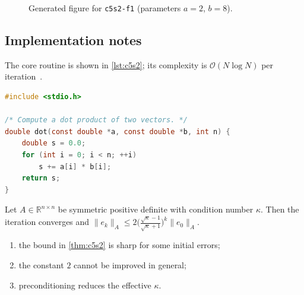 \begin{figure}[htbp]
\centering
{}
\caption{Generated figure for \texttt{c5s2-f1} (parameters $a=2$, $b=8$).}\label{fig:c5s2-f1}
\end{figure}

\lipsum[130-131]

\subsection{Implementation notes}\label{sec:c5s2-i}
The core routine is shown in \cref{lst:c5s2}; its complexity is $\mathcal{O}(N\log N)$ per iteration~\cite{ch5-6}.

\begin{lstlisting}[language=c,caption={Reference implementation for c5s2.},label={lst:c5s2}]
#include <stdio.h>

/* Compute a dot product of two vectors. */
double dot(const double *a, const double *b, int n) {
    double s = 0.0;
    for (int i = 0; i < n; ++i)
        s += a[i] * b[i];
    return s;
}
\end{lstlisting}

\lipsum[132-132]
\begin{theorem}\label{thm:c5s2}
Let $A\in\mathbb{R}^{n\times n}$ be symmetric positive definite with condition number $\kappa$. Then the iteration converges and
$\lVert e_k\rVert_A \le 2\bigl(\tfrac{\sqrt\kappa-1}{\sqrt\kappa+1}\bigr)^k\lVert e_0\rVert_A$.
\end{theorem}
\begin{enumerate}[label=(\roman*)]
\item the bound in \cref{thm:c5s2} is sharp for some initial errors;
\item the constant $2$ cannot be improved in general;
\item preconditioning reduces the effective $\kappa$.
\end{enumerate}

\lipsum[70-70]
